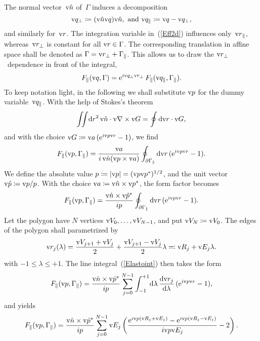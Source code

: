 The normal vector~$\text{v}{\hat n}$ of~$\Gamma$ induces a decomposition
\begin{equation}
  \text{v}{q}_\perp\coloneqq(\text{v}{\hat n}\text{v}{q})\text{v}{\hat n},\text{~and~}\text{v}{q}_\parallel\coloneqq\text{v}{q}-\text{v}{q}_\perp,
\end{equation}
and similarly for~$\text{v}{r}$.
The integration variable in~(\ref{Eff2d}) influences only~$\text{v}{r}_\parallel$,
whereas~$\text{v}{r}_\perp$ is constant for all $\text{v}{r}\in\Gamma$.
The corresponding translation in affine space
shall be denoted as $\Gamma=\text{v}{r}_\perp+\Gamma_\parallel$.
This allows us to draw the $\text{v}{r}_\perp$~dependence in front of the integral,
\begin{equation}\label{EF2F2}
  F_\parallel(\text{v}{q},\Gamma)
  = \text{e}^{i\text{v}{q}_\perp\text{v}{r}_\perp}\,F_\parallel(\text{v}{q}_\parallel,\Gamma_\parallel).
\end{equation}
To keep notation light,
in the following we shall substitute $\text{v}{p}$ for the dummy variable~$\text{v}{q}_\parallel$.
With the help of Stokes's theorem
\begin{equation}\label{EStokes}
  \iint\!\text{d} r^2\,\text{v}{\hat n}\cdot\text{v}{\nabla}\times\text{v}{G} = \oint \text{d}\text{v}{r}\cdot\text{v}{G},
\end{equation}
and with the choice $\text{v}{G}\coloneqq\text{v}{a}\, (\text{e}^{i\text{v}{p}\text{v}{r}}-1)$,
we find
\begin{equation}
  F_\parallel(\text{v}{p},\Gamma_\parallel)=\frac{\text{v}{a}}{i\, \text{v}{\hat n}(\text{v}{p}\times\text{v}{a})} \oint_{\partial\Gamma_\parallel} \text{d}\text{v}{r}\,(\text{e}^{i\text{v}{p}\text{v}{r}}-1).
\end{equation}
We define the absolute value
$p\coloneqq|\text{v}{p}|=(\text{v}{p}\text{v}{p}^*)^{1/2}$,
and the unit vector $\text{v}{\hat p}\coloneqq\text{v}{p}/p$.
With the choice $\text{v}{a}\coloneqq\text{v}{\hat n}\times\text{v}{p}^*$,
the form factor becomes
\begin{equation}\label{Elastoint}
  F_\parallel(\text{v}{p},\Gamma_\parallel)=\frac{\text{v}{\hat n}\times\text{v}{\hat p}^*}{ip} \oint_{\partial\Gamma_\parallel} \text{d}\text{v}{r}\,(\text{e}^{i\text{v}{p}\text{v}{r}}-1).
\end{equation}
Let the polygon have $N$ vertices $\text{v}{V}_0,\ldots,\text{v}{V}_{N-1}$,
and put $\text{v}{V}_N\coloneqq\text{v}{V}_0$.
The edges of the polygon shall parametrized by
\begin{equation}
  \text{v}{r}_j(\lambda) = \frac{\text{v}{V}_{j+1}+\text{v}{V}_j}{2} + \frac{\text{v}{V}_{j+1}-\text{v}{V}_j}{2} \lambda
  \eqqcolon \text{v}{R}_j + \text{v}{E}_j\lambda.
\end{equation}
with $-1\le\lambda\le+1$.
The line integral~(\ref{Elastoint}) then takes the form
\begin{equation}
    F_\parallel(\text{v}{p},\Gamma_\parallel)
   = \frac{\text{v}{\hat n}\times\text{v}{\hat p}^*}{ip} \sum_{j=0}^{N-1}
              \int_{-1}^{+1}\!\text{d}\lambda\, \frac{\text{d}\text{v}{r}_j}{\text{d}\lambda}\,(\text{e}^{i\text{v}{p}\text{v}{r}}-1),
\end{equation}
and yields
\begin{equation}\label{Effpolygon1}
    F_\parallel(\text{v}{p},\Gamma_\parallel)
    = \frac{\text{v}{\hat n}\times\text{v}{\hat p}^*}{ip}
      \sum_{j=0}^{N-1} \text{v}{E}_j
      \left( \frac{\text{e}^{i\text{v}{p}(\text{v}{R}_j+\text{v}{E}_j)}-\text{e}^{i\text{v}{p}(\text{v}{R}_j-\text{v}{E}_j)}}{i\text{v}{p}\text{v}{E}_j} - 2 \right).
\end{equation}
